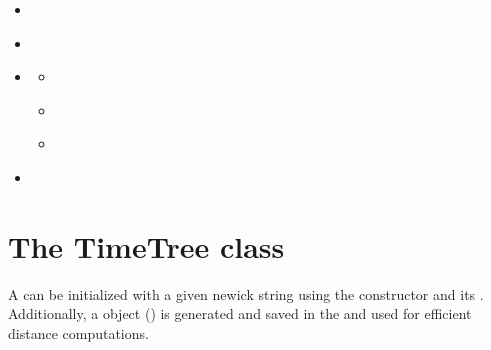 \documentclass[letterpaper,10pt,english]{sphinxmanual}
\begin{document}
\begin{sphinxShadowBox}
\begin{itemize}
\begin{itemize}
\item {} 
\sphinxAtStartPar
{}\label{\detokenize{trees:id9}}{\hyperref[\detokenize{trees:combining-multiple-timetreesets}]{}}

\item {} 
\sphinxAtStartPar
{}\label{\detokenize{trees:id10}}{\hyperref[\detokenize{trees:general-functions}]{}}

\item {} 
\sphinxAtStartPar
{}\label{\detokenize{trees:id11}}{\hyperref[\detokenize{trees:classes-for-the-c-library}]{}}
\begin{itemize}
\item {} 
\sphinxAtStartPar
{}\label{\detokenize{trees:id12}}{\hyperref[\detokenize{trees:node}]{}}

\item {} 
\sphinxAtStartPar
{}\label{\detokenize{trees:id13}}{\hyperref[\detokenize{trees:tree}]{}}

\item {} 
\sphinxAtStartPar
{}\label{\detokenize{trees:id14}}{\hyperref[\detokenize{trees:treelist}]{}}

\end{itemize}

\item {} 
\sphinxAtStartPar
{}\label{\detokenize{trees:id15}}{\hyperref[\detokenize{trees:class-converter-functions}]{}}

\end{itemize}

\end{itemize}
\end{sphinxShadowBox}


\section{The TimeTree class}
\label{\detokenize{trees:the-timetree-class}}
\sphinxAtStartPar
A  can be initialized with a given newick string using the  constructor and its .
Additionally, a  object ({\hyperref[\detokenize{trees:c-classes}]{}}) is generated and saved in the  and used for efficient distance computations.
\end{document}
